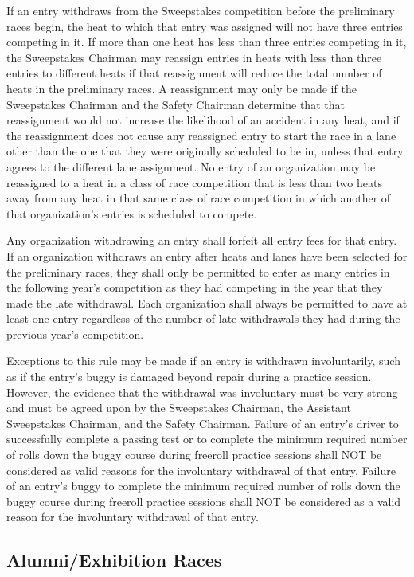 	If an entry withdraws from the Sweepstakes competition before the preliminary
	races begin, the heat to which that entry was assigned will not have three
	entries competing in it. If more than one heat has less than three entries
	competing in it, the Sweepstakes Chairman may reassign entries in heats with
	less than three entries to different heats if that reassignment will reduce the
	total number of heats in the preliminary races. A reassignment may only be made
	if the Sweepstakes Chairman and the Safety Chairman determine that that
	reassignment would not increase the likelihood of an accident in any heat, and
	if the reassignment does not cause any reassigned entry to start the race in a
	lane other than the one that they were originally scheduled to be in, unless
	that entry agrees to the different lane assignment. No entry of an organization
	may be reassigned to a heat in a class of race competition that is less than
	two heats away from any heat in that same class of race competition in which
	another of that organization's entries is scheduled to compete.

	Any organization withdrawing an entry shall forfeit all entry fees for that
	entry. If an organization withdraws an entry after heats and lanes have been
	selected for the preliminary races, they shall only be permitted to enter as
	many entries in the following year's competition as they had competing in the
	year that they made the late withdrawal. Each organization shall always be
	permitted to have at least one entry regardless of the number of late
	withdrawals they had during the previous year's competition.

	Exceptions to this rule may be made if an entry is withdrawn involuntarily,
	such as if the entry's buggy is damaged beyond repair during a practice
	session. However, the evidence that the withdrawal was involuntary must be very
	strong and must be agreed upon by the Sweepstakes Chairman, the Assistant
	Sweepstakes Chairman, and the Safety Chairman. Failure of an entry's driver to
	successfully complete a passing test or to complete the minimum required number
	of rolls down the buggy course during freeroll practice sessions shall NOT be
	considered as valid reasons for the involuntary withdrawal of that entry.
	Failure of an entry's buggy to complete the minimum required number of rolls
	down the buggy course during freeroll practice sessions shall NOT be considered
	as a valid reason for the involuntary withdrawal of that entry.

\subsection{Alumni/Exhibition Races}

